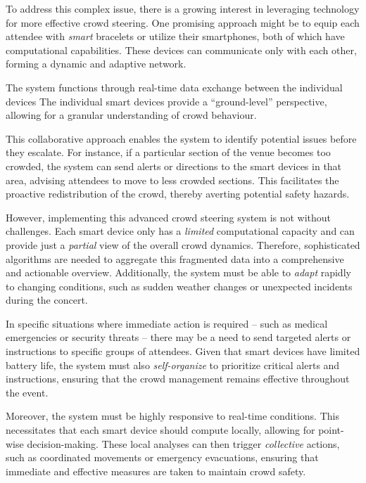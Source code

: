 To address this complex issue, 
 there is a growing interest in leveraging technology for more effective crowd steering. 
 One promising approach might be to equip each attendee with \emph{smart} bracelets or utilize their smartphones, 
 both of which have computational capabilities. 
 These devices can communicate only with each other, 
 forming a dynamic and adaptive network.

The system functions through real-time data exchange 
 between the individual devices %
 The individual smart devices provide a ``ground-level'' perspective, 
 allowing for a granular understanding of crowd behaviour.

This collaborative approach enables the system to identify potential issues before they escalate. 
 For instance, if a particular section of the venue becomes too crowded, 
 the system can send alerts or directions to the smart devices in that area, 
 advising attendees to move to less crowded sections. 
 This facilitates the proactive redistribution of the crowd, 
 thereby averting potential safety hazards.

However, implementing this advanced crowd steering system is not without challenges. 
 Each smart device only has a \emph{limited} computational capacity 
 and can provide just a \emph{partial} view of the overall crowd dynamics. 
Therefore, sophisticated algorithms are needed to aggregate 
 this fragmented data into a comprehensive and actionable overview. 
 Additionally, the system must be able to \emph{adapt} rapidly to changing conditions, 
 such as sudden weather changes or unexpected incidents during the concert.

In specific situations where immediate action is required 
 -- such as medical emergencies or security threats -- 
 there may be a need to send targeted alerts or instructions to specific groups of attendees. 
 Given that smart devices have limited battery life, 
 the system must also \emph{self-organize} to prioritize critical alerts and instructions, 
 ensuring that the crowd management remains effective throughout the event.

Moreover, the system must be highly responsive to real-time conditions. 
 This necessitates that each smart device should compute locally, 
 allowing for point-wise decision-making. 
 These local analyses can then trigger \emph{collective} actions, 
 such as coordinated movements or emergency evacuations, 
 ensuring that immediate and effective measures are taken to maintain crowd safety.

